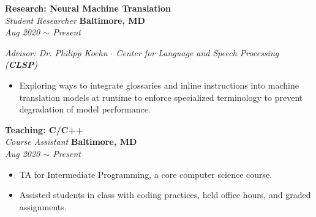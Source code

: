 \documentclass[10pt, letterpaper]{article}
\begin{document}
\begin{paracol}{2}
	\textbf{Research: Neural Machine Translation}\\
	\textit{Student Researcher}
	\switchcolumn
	\raggedleft\textbf{Baltimore, MD}\\
	\raggedleft\textit{Aug 2020 $\sim$ Present}
\end{paracol}\vspace{-1mm}
\textit{Advisor: Dr. Philipp Koehn $\cdot$ Center for Language and Speech Processing (\textbf{CLSP})}
\vspace{-2mm}
\begin{itemize}
	\item Exploring ways to integrate glossaries and inline instructions into machine translation models at runtime to enforce specialized terminology to prevent degradation of model performance. 
	 
\end{itemize}
\vspace{-2mm} 

\begin{paracol}{2}
	\textbf{Teaching: C/C++}\\
	\textit{Course Assistant}
	\switchcolumn
	\raggedleft\textbf{Baltimore, MD}\\
	\raggedleft\textit{Aug 2020 $\sim$ Present}
\end{paracol}\vspace{-1mm}
\vspace{-2mm}
\begin{itemize}
	\item TA for Intermediate Programming, a core computer science course. 
	\vspace{-3mm}
	\item Assisted students in class with coding practices, held office hours, and graded assignments.
\end{itemize}
\vspace{-2mm}
\end{document}
